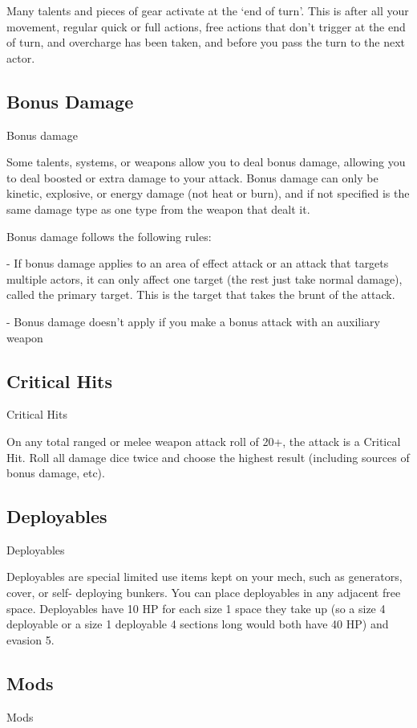 Many talents and pieces of gear activate at the `end of turn'. This is after all your movement,
regular quick or full actions, free actions that don't trigger at the end of turn, and overcharge has
been taken, and before you pass the turn to the next actor.

\subsection{Bonus Damage}
\hypertarget{BonusDamage}{Bonus damage}

Some talents, systems, or weapons allow you to deal bonus damage, allowing you to deal
boosted or extra damage to your attack. Bonus damage can only be kinetic, explosive, or energy
damage (not heat or burn), and if not specified is the same damage type as one type from the
weapon that dealt it.

Bonus damage follows the following rules:

         	- If bonus damage applies to an area of effect attack or an attack that targets multiple
         actors, it can only affect one target (the rest just take normal damage), called the primary
         target. This is the target that takes the brunt of the attack.

         	- Bonus damage doesn't apply if you make a bonus attack with an auxiliary weapon

\subsection{Critical Hits}
\hypertarget{CriticalHit}{Critical Hits}

On any total ranged or melee weapon attack roll of 20+, the attack is a Critical Hit. Roll all
damage dice twice and choose the highest result (including sources of bonus damage, etc).

\subsection{Deployables}
\hypertarget{Deployable}{Deployables}

Deployables are special limited use items kept on your mech, such as generators, cover, or self-
deploying bunkers. You can place deployables in any adjacent free space. Deployables have 10
HP for each size 1 space they take up (so a size 4 deployable or a size 1 deployable 4 sections
long would both have 40 HP) and evasion 5.

\subsection{Mods}
\hypertarget{Mod}{Mods}

